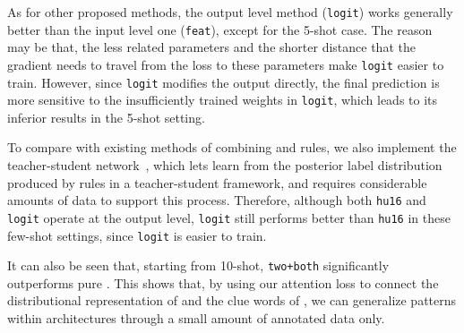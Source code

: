 As for other proposed methods, the output level method (\texttt{logit}) works generally better than the input level one (\texttt{feat}), except for the 5-shot case.
The reason may be that, the less \RE related parameters and 
the shorter distance that the gradient needs to travel from the loss to these parameters
make \texttt{logit} easier to train. 
However, since \texttt{logit} modifies the output directly, the final prediction is more sensitive to the insufficiently trained weights in \texttt{logit}, which leads to its inferior results in the 5-shot setting.

To compare with existing methods of combining \NN and rules, we also implement the teacher-student
network~\cite{hu2016harnessing}, %
which lets \NN learn from the posterior label distribution produced by \FOL rules in a teacher-student framework,
and requires considerable amounts of data to support this process.
Therefore, although both \texttt{hu16} and \texttt{logit} operate at the output level, \texttt{logit}
still performs better than \texttt{hu16} in these few-shot settings, since \texttt{logit} is easier to train.


It can also be seen that, starting from 10-shot, \texttt{two+both} significantly outperforms pure \RE.
This shows that, by using our attention loss to connect the distributional representation of \NN and the clue words of \RE, we can generalize \RE patterns within \NN architectures through a small amount of annotated data only.


